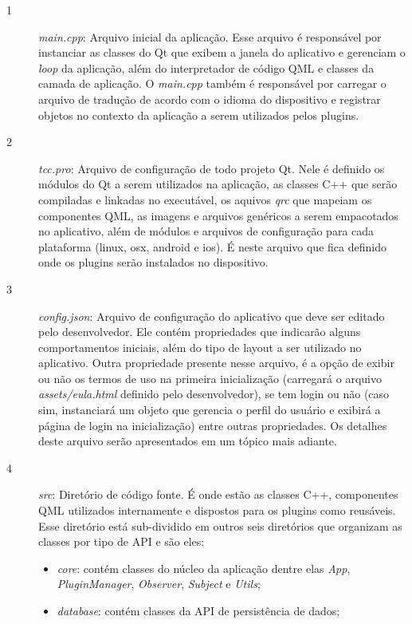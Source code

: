 \begin{description}
	\item[1] \textit{main.cpp}: Arquivo inicial da aplicação. Esse arquivo é responsável por instanciar as classes do Qt que exibem a janela do aplicativo e gerenciam o \textit{loop} da aplicação, além do interpretador de código QML e classes da camada de aplicação. O \textit{main.cpp} também é responsável por carregar o arquivo de tradução de acordo com o idioma do dispositivo e registrar objetos no contexto da aplicação a serem utilizados pelos plugins.

	\item[2] \textit{tcc.pro}: Arquivo de configuração de todo projeto Qt. Nele é definido os módulos do Qt a serem utilizados na aplicação, as classes C++ que serão compiladas e linkadas no executável, os aquivos \textit{qrc} que mapeiam os componentes QML, as imagens e arquivos genéricos a serem empacotados no aplicativo, além de módulos e arquivos de configuração para cada plataforma (linux, osx, android e ios). É neste arquivo que fica definido onde os plugins serão instalados no dispositivo.

	\item[3] \textit{config.json}: Arquivo de configuração do aplicativo que deve ser editado pelo desenvolvedor. Ele contém propriedades que indicarão alguns comportamentos iniciais, além do tipo de layout a ser utilizado no aplicativo. Outra propriedade presente nesse arquivo, é a opção de exibir ou não os termos de uso na primeira inicialização (carregará o arquivo \textit{assets/eula.html} definido pelo desenvolvedor), se tem login ou não (caso sim, instanciará um objeto que gerencia o perfil do usuário e exibirá a página de login na inicialização) entre outras propriedades. Os detalhes deste arquivo serão apresentados em um tópico mais adiante.

	\item[4] \textit{src}: Diretório de código fonte. É onde estão as classes C++, componentes QML utilizados internamente e dispostos para os plugins como reusáveis. Esse diretório está sub-dividido em outros seis diretórios que organizam as classes por tipo de API e são eles:

	\begin{itemize}
		\item \textit{core}: contém classes do núcleo da aplicação dentre elas \textit{App}, \textit{PluginManager}, \textit{Observer}, \textit{Subject} e \textit{Utils}; 

		\item \textit{database}: contém classes da API de persistência de dados;


\end{itemize}
\end{description}
